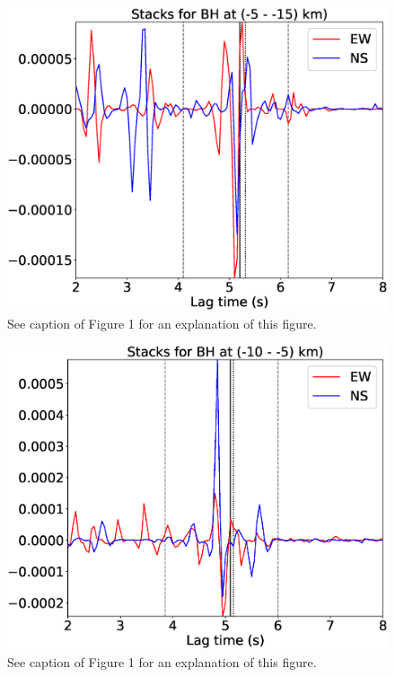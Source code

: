 \documentclass[letterpaper, 12pt]{article}
\begin{document}
\begin{figure}[H]
\includegraphics[width=\linewidth]{figures/intervals/BH_-05_-15_stacks.eps}
\caption{See caption of Figure 1 for an explanation of this figure.}
\end{figure}

\begin{figure}[H]
\includegraphics[width=\linewidth]{figures/intervals/BH_-10_-05_stacks.eps}
\caption{See caption of Figure 1 for an explanation of this figure.}
\end{figure}
\end{document}
